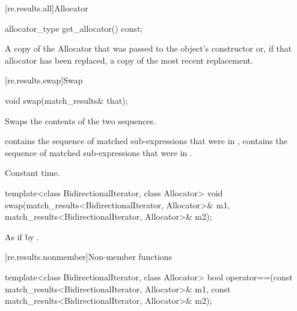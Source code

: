 [re.results.all]{Allocator}%

%
\begin{itemdecl}
allocator_type get_allocator() const;
\end{itemdecl}

\begin{itemdescr}
\pnum
\returns
A copy of the Allocator that was passed to the object's constructor or, if that
allocator has been replaced, a copy of the most recent replacement.
\end{itemdescr}

[re.results.swap]{Swap}

%
\begin{itemdecl}
void swap(match_results& that);
\end{itemdecl}

\begin{itemdescr}
\pnum
\effects
Swaps the contents of the two sequences.

\pnum
\ensures
{} contains the sequence of matched
sub-expressions that were in ,  contains the
sequence of matched sub-expressions that were in .

\pnum
\complexity
Constant time.
\end{itemdescr}

%
\begin{itemdecl}
template<class BidirectionalIterator, class Allocator>
  void swap(match_results<BidirectionalIterator, Allocator>& m1,
            match_results<BidirectionalIterator, Allocator>& m2);
\end{itemdecl}

\pnum
\effects
As if by .

[re.results.nonmember]{Non-member functions}

%
\begin{itemdecl}
template<class BidirectionalIterator, class Allocator>
  bool operator==(const match_results<BidirectionalIterator, Allocator>& m1,
                  const match_results<BidirectionalIterator, Allocator>& m2);
\end{itemdecl}

